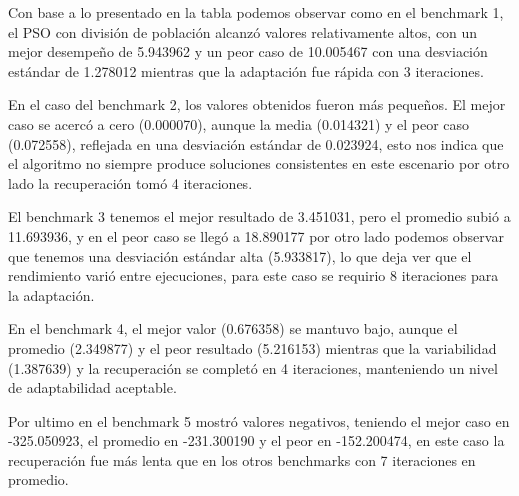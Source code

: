 \documentclass[10pt]{article}
\begin{document}
Con base a lo presentado en la tabla podemos observar como en el benchmark 1, el PSO con división de población alcanzó valores relativamente altos, con un mejor desempeño de 5.943962 y un peor caso de 10.005467 con una desviación estándar de 1.278012 mientras que la adaptación fue rápida con 3 iteraciones.

En el caso del benchmark 2, los valores obtenidos fueron más pequeños. El mejor caso se acercó a cero (0.000070), aunque la media (0.014321) y el peor caso (0.072558), reflejada en una desviación estándar de 0.023924, esto nos indica que el algoritmo no siempre produce soluciones consistentes en este escenario por otro lado la recuperación tomó 4 iteraciones.

El benchmark 3 tenemos el mejor resultado de 3.451031, pero el promedio subió a 11.693936, y en el peor caso se llegó a 18.890177 por otro lado podemos observar que tenemos una desviación estándar alta (5.933817), lo que deja ver que el rendimiento varió entre ejecuciones, para este caso se requirio 8 iteraciones para la adaptación.

En el benchmark 4, el mejor valor (0.676358) se mantuvo bajo, aunque el promedio (2.349877) y el peor resultado (5.216153) mientras que la variabilidad (1.387639) y la recuperación se completó en 4 iteraciones, manteniendo un nivel de adaptabilidad aceptable.

Por ultimo en el benchmark 5 mostró valores negativos, teniendo el mejor caso en -325.050923, el promedio en -231.300190 y el peor en -152.200474, en este caso la recuperación fue más lenta que en los otros benchmarks con 7 iteraciones en promedio.


\end{document}
